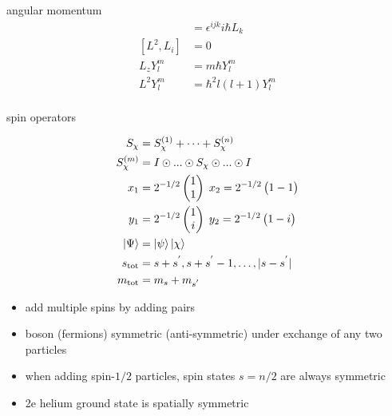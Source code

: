 \documentclass[avery5388, frame]{flashcards}
\begin{document}
\begin{flashcard}{angular momentum}
  {
    \begin{align*}
      [L_{i}, L_{j}] &= \epsilon^{ijk} i \hbar L_{k}\\
      [L^{2}, L_{i}] &= 0\\
      L_{z} Y_{l}^{m} &= m \hbar Y_{l}^{m}\\
      L^{2} Y_{l}^{m} &= \hbar^{2} l(l + 1) Y_{l}^{m}\\
    \end{align*}
  }
\end{flashcard}

\begin{flashcard}{spin operators}
  {
    \begin{align*}
      S_{\chi} &= S_{\chi}^{(1)} + \dots + S_{\chi}^{(n)}\\
      S_{\chi}^{(m)} &= I \odot ... \odot S_{\chi} \odot ... \odot I\\
      x_{1} &= 2^{-1/2} \begin{pmatrix} 1\\ 1 \end{pmatrix} \; x_{2} = 2^{-1/2} \begin{pmatrix} 1 -1 \end{pmatrix}\\
      y_{1} &= 2^{-1/2} \begin{pmatrix} 1\\ i \end{pmatrix} \; y_{2} = 2^{-1/2} \begin{pmatrix} 1 -i \end{pmatrix}\\
      \ket{\Psi} &= \ket{\psi} \ket{\chi}\\
      s_{\textrm{tot}} &= s + s^{'}, s + s^{'} - 1, \dots, \lvert s - s^{'} \rvert\\
      m_{\textrm{tot}} &= m_{s} + m_{s^{'}}
    \end{align*}

    \begin{itemize}
    \item add multiple spins by adding pairs
    \item boson (fermions) symmetric (anti-symmetric) under exchange of any two particles
    \item when adding spin-$1/2$ particles, spin states $s = n / 2$ are always symmetric
    \item 2e helium ground state is spatially symmetric
    \end{itemize}
  }
\end{flashcard}
\end{document}

